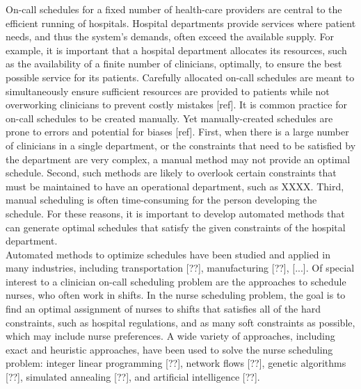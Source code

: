 On-call schedules for a fixed number of health-care providers are central to the efficient running of hospitals. Hospital departments provide services where patient needs, and thus the system's demands, often exceed the available supply. For example, it is important that a hospital department allocates its resources, such as the availability of a finite number of clinicians, optimally, to ensure the best possible service for its patients. Carefully allocated on-call schedules are meant to simultaneously ensure sufficient resources are provided to patients while not overworking clinicians to prevent costly mistakes [ref]. It is common practice for on-call schedules to be created manually. Yet manually-created schedules are prone to errors and potential for biases [ref]. First, when there is a large number of clinicians in a single department, or the constraints that need to be satisfied by the department are very complex, a manual method may not provide an optimal schedule. Second, such methods are likely to overlook certain constraints that must be maintained to have an operational department, such as XXXX. Third, manual scheduling is often time-consuming for the person developing the schedule. For these reasons, it is important to develop automated methods that can generate optimal schedules that satisfy the given constraints of the hospital department. \\


Automated methods to optimize schedules have been studied and applied in many industries, including transportation [??], manufacturing [??], [...]. Of special interest to a clinician on-call scheduling problem are the approaches to schedule nurses, who often work in shifts. In the nurse scheduling problem, the goal is to find an optimal assignment of nurses to shifts that satisfies all of the hard constraints, such as hospital regulations, and as many soft constraints as possible, which may include nurse preferences. A wide variety of approaches, including exact and heuristic approaches, have been used to solve the nurse scheduling problem: integer linear programming [??], network flows [??], genetic algorithms [??], simulated annealing [??], and artificial intelligence [??]. 

